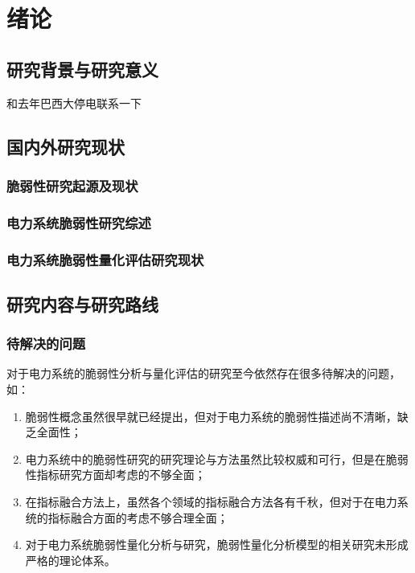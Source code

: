 \chapter{绪论}

\section{研究背景与研究意义}
\label{sec:research_background}
和去年巴西大停电联系一下

\section{国内外研究现状}
\label{sec:research_presentSituation}

\subsection{脆弱性研究起源及现状}
\label{sec:origin}


\subsection{电力系统脆弱性研究综述}
\label{sec:presentPowerSys}


\subsection{电力系统脆弱性量化评估研究现状}
\label{sec:presentSituation3}

\section{研究内容与研究路线}
\label{sec:research_curise}

\subsection{待解决的问题}
\label{sec:research_problem}
对于电力系统的脆弱性分析与量化评估的研究至今依然存在很多待解决的问题，如：
\begin{enumerate}[(1)]
  \item 脆弱性概念虽然很早就已经提出，但对于电力系统的脆弱性描述尚不清晰，缺乏全面性；
  \item 电力系统中的脆弱性研究的研究理论与方法虽然比较权威和可行，但是在脆弱性指标研究方面却考虑的不够全面；
  \item 在指标融合方法上，虽然各个领域的指标融合方法各有千秋，但对于在电力系统的指标融合方面的考虑不够合理全面；
  \item 对于电力系统脆弱性量化分析与研究，脆弱性量化分析模型的相关研究未形成严格的理论体系。
 \end{enumerate}

